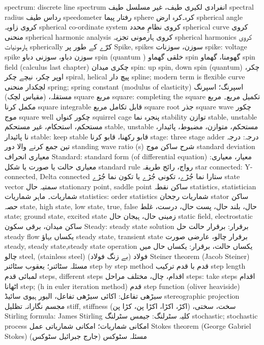spectrum: discrete line spectrum	انفرادی لکیری طیف، غیر مسلسل طیف
spectral radius	رداس طیف
speedometer	رفتار پیما
sphere	کرہ۔کرہ ارض
spherical angle	کروی زاویہ
spherical co-ordinate system	کروی نظامِ محدد
spherical curve	کروی منحنی
spherical harmonic analysis	کروی ہارمونی تجزیہ
spherical harmonics	کروی ہارمونیات
spherically	کرّے کے طور پر
Spike, spikes	سوزن، سوزنات
spike: voltage spike	سوزن دباو، سوزنی دباو
spin (quantum )	خلقی گھماو
spin	گھومنا، گھماو
spin field (calculus last chapter)	چکری میدان
spin: up spin, down spin (quantum)	چکر، اوپر چکر، نیچے چکر
spiral, helical	پیچ دار
spline; modern term is flexible curve	لچکدار منحنی
spring; spring constant (modulus of elasticity)	اسپرنگ؛ اسپرنگ مستقلہ، (مقیاس لچک)
square	مربع
square: completing the square	تکمیل مربع۔ مربع مکمل کرنا
square integrable	قابل تکامل مربع
square root	جذر
square wave	چکور موج
square well	چکور کنواں
squirrel cage	پنجرہ نما
stability	توازن
stable, unstable	مستحکم، استحکام، غیر مستحکم
stable, unstable	مستحکم، متوازن، مضبوط، پائیدار، نا پائیدار
stable: keep stable	قابو رکھنا، قابو کرنا
stage: three stage adder	درجہ: درجہ تین جمع کرنے والا دور
standing wave ratio (s)	شرح ساکن موج
standard deviation	معیاری انحراف
Standard: standard form (of differential equation)	معیار، معیاری: معیاری حالت یا صورت یا شکل
standard rule	رواج، رائج طریقہ
star connected: Y-connected, Delta connected	ستارا نما جُڑے، تکونی جُڑے یا تکون نما جُڑے
state vector	سمتیہ حال
stationary point, saddle point	ساکن نقطہ
statistics, statistician	شماریات۔ ماہر شماریات
statistics: order statistics	شماریات رجحان
stator	ساکن حصہ
state, high state, low state, true, false	حال، بلند حال، پست حال، درست، غلط
state; ground state, excited state	زمینی حال، ہیجان حال
static field, electrostatic	ساکن میدان، برقی سکون
Steady: steady state solution	برقرار: برقرار حالت حل
steady flow	یکساں بہاؤ
steady state, transient state	برقرار چالو، عارضی صورت
steady, steady state,steady state operation	یکساں حالت، برقرار: یکساں حال میں چالو
steel, (stainless steel)	فولاد (بے زنگ فولاد)
Steiner theorem (Jacob Steiner)	مسئلہ سٹائنر؛ یعقوب سٹائنر
step by step method	قدم با قدم ترکیب
step length	لمبائی قدم
steps, different steps	اقدام، چال، مختلف مراحل
steps: take steps	اقدام اٹھانا
step; (h in euler iteration method)	قدم
step function (oliver heaviside)	 سیڑھی تفاعل: اکائی سیڑھی تفاعل، الیور ہیوی سائیڈ
stereographic projection	مجسم نگارانہ تظلیل
stiff, stiffness	سخت، سختی، (اکڑ، اکڑا، اکڑا پن،  کڑا پن)
Stirling formula: James Stirling	کلیہ سٹرلنگ: جیمس سٹرلنگ
stochastic; stochastic process	امکانی شماریات؛ امکانی شماریاتی عمل
Stokes theorem (George Gabriel Stokes)	مسئلہ سٹوکس (جارج جبرائیل سٹوکس)
